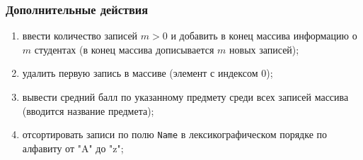 \documentclass[12pt,a4paper]{report}
\begin{document}
\subsubsection*{Дополнительные действия}
\begin{enumerate}
\item ввести количество записей $m > 0$ и добавить в конец массива информацию о $m$ студентах (в конец массива дописывается $m$ новых записей);
\item удалить первую запись в массиве (элемент с индексом 0);
\item вывести средний балл по указанному предмету среди всех записей массива (вводится название предмета);
\item отсортировать записи по полю \texttt{Name} в лексикографическом порядке по алфавиту от "A" до "z";
\end{enumerate}
\end{document}
